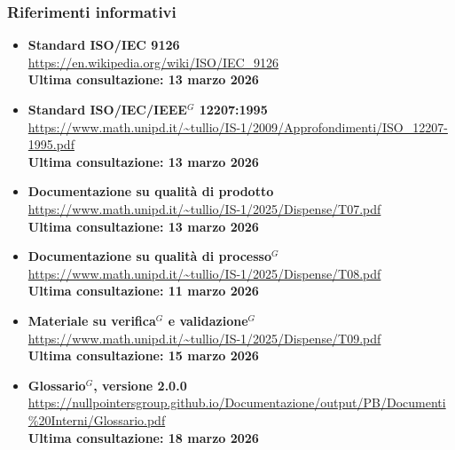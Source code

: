 	\subsubsection{Riferimenti informativi}
	\begin{itemize}[itemsep=5pt, parsep=5pt, label=$\scriptstyle\bullet$]

    \item \textbf{Standard ISO/IEC 9126}\\
     \url{https://en.wikipedia.org/wiki/ISO/IEC_9126}\\[3pt]
    \textbf{Ultima consultazione: 13 marzo 2026}

    \item \textbf{Standard ISO/IEC/IEEE$^G$ 12207:1995}\\
     \url{https://www.math.unipd.it/~tullio/IS-1/2009/Approfondimenti/ISO_12207-1995.pdf}\\[3pt]
    \textbf{Ultima consultazione: 13 marzo 2026}

    \item \textbf{Documentazione su qualità di prodotto}\\
     \url{https://www.math.unipd.it/~tullio/IS-1/2025/Dispense/T07.pdf}\\[3pt]
    \textbf{Ultima consultazione: 13 marzo 2026}

	\item \textbf{Documentazione su qualità di processo$^G$}\\
     \url{https://www.math.unipd.it/~tullio/IS-1/2025/Dispense/T08.pdf}\\[3pt]
    \textbf{Ultima consultazione: 11 marzo 2026}

	\item \textbf{Materiale su verifica$^G$ e validazione$^G$}\\
     \url{https://www.math.unipd.it/~tullio/IS-1/2025/Dispense/T09.pdf}\\[3pt]
    \textbf{Ultima consultazione: 15 marzo 2026}

	\item \textbf{Glossario$^G$, versione 2.0.0}\\
     \url{https://nullpointersgroup.github.io/Documentazione/output/PB/Documenti%20Interni/Glossario.pdf}\\[3pt]
    \textbf{Ultima consultazione: 18 marzo 2026}

	\end{itemize}
